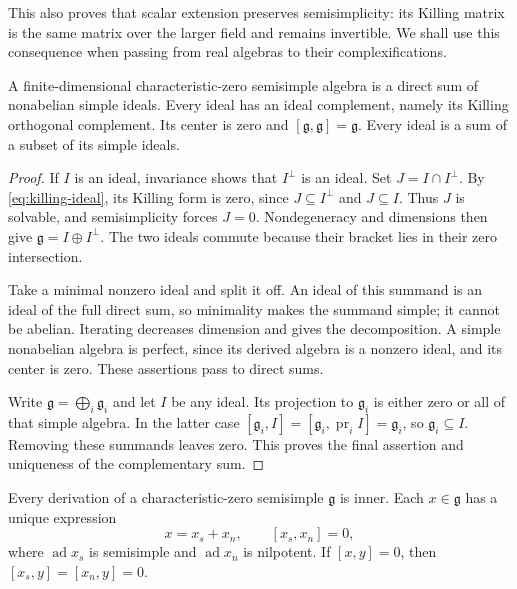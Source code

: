 This also proves that scalar extension preserves
semisimplicity: its Killing matrix is the same matrix
over the larger field and remains invertible. We shall
use this consequence when passing from real algebras
to their complexifications.

\begin{theorem}\label{res:B06}
A finite-dimensional characteristic-zero semisimple algebra
is a direct sum of nonabelian simple ideals. Every ideal
has an ideal complement, namely its Killing orthogonal
complement. Its center is zero and
\([\mathfrak g,\mathfrak g]=\mathfrak g\).
Every ideal is a sum of a subset of its simple ideals.
\end{theorem}

\begin{proof}
If \(I\) is an ideal, invariance shows that \(I^\perp\)
is an ideal. Set \(J=I\cap I^\perp\). By
\eqref{eq:killing-ideal}, its Killing form is zero,
since \(J\subseteq I^\perp\) and \(J\subseteq I\).
Thus \(J\) is solvable, and semisimplicity forces \(J=0\).
Nondegeneracy and dimensions then give
\(\mathfrak g=I\oplus I^\perp\).
The two ideals commute because their bracket lies in
their zero intersection.

Take a minimal nonzero ideal and split it off.
An ideal of this summand is an ideal of the full direct
sum, so minimality makes the summand simple; it cannot
be abelian. Iterating decreases dimension and gives the
decomposition. A simple nonabelian algebra is perfect,
since its derived algebra is a nonzero ideal, and its
center is zero. These assertions pass to direct sums.

Write \(\mathfrak g=\bigoplus_i\mathfrak g_i\) and let
\(I\) be any ideal. Its projection to \(\mathfrak g_i\)
is either zero or all of that simple algebra. In the
latter case
\([\mathfrak g_i,I]=
[\mathfrak g_i,\operatorname{pr}_i I]=\mathfrak g_i\),
so \(\mathfrak g_i\subseteq I\). Removing these
summands leaves zero. This proves the final assertion
and uniqueness of the complementary sum.
\end{proof}

\begin{theorem}
\label{res:B07}
Every derivation of a characteristic-zero semisimple
\(\mathfrak g\) is inner. Each \(x\in\mathfrak g\) has a
unique expression
\[
 x=x_s+x_n,\qquad [x_s,x_n]=0,
\]
where \(\operatorname{ad}x_s\) is semisimple and
\(\operatorname{ad}x_n\) is nilpotent. If \([x,y]=0\),
then \([x_s,y]=[x_n,y]=0\).
\end{theorem}


